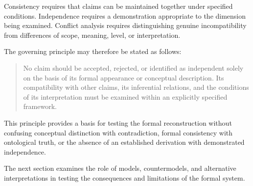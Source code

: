 Consistency requires that claims can be maintained
together under specified conditions. Independence
requires a demonstration appropriate to the dimension
being examined. Conflict analysis requires distinguishing
genuine incompatibility from differences of scope,
meaning, level, or interpretation.

The governing principle may therefore be stated as follows:

\begin{quote}
No claim should be accepted, rejected, or identified
as independent solely on the basis of its formal
appearance or conceptual description. Its compatibility
with other claims, its inferential relations, and
the conditions of its interpretation must be examined
within an explicitly specified framework.
\end{quote}

This principle provides a basis for testing the formal
reconstruction without confusing conceptual distinction
with contradiction, formal consistency with ontological
truth, or the absence of an established derivation
with demonstrated independence.

The next section examines the role of models,
countermodels, and alternative interpretations in
testing the consequences and limitations of the
formal system.

